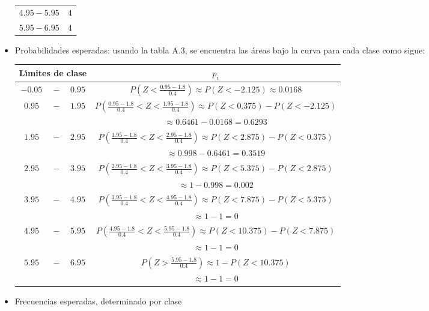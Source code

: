\begin{solucion}
\begin{datos}
\begin{itemize}
\begin{center}
\begin{tabular}{cc}
     $4.95 - 5.95$ & $4$ \\
     $5.95 - 6.95$ & $4$ \\
     \hline 
    \end{tabular}
   \end{center}
   \item Probabilidades esperadas: usando la tabla A.3,
   se encuentra las \'areas bajo la curva para cada clase como sigue:
   \begin{center}
    \begin{tabular}{cccc}
     \hline 
     \multicolumn{3}{c}{\textbf{L\'{\i}mites de clase}} & $p_i$ \\
     \hline 
     $-0.05$ & $-$ & $0.95$ &
     $P\left( Z<\frac{0.95 - 1.8}{0.4}\right) \approx P(Z<-2.125)\approx 0.0168$ \\
     $0.95$ & $-$ & $1.95$ &
     $P\left( \frac{0.95 - 1.8}{0.4} < Z < \frac{1.95 - 1.8}{0.4} \right)
     \approx P(Z < 0.375) - P(Z < -2.125)$ \\
     & & & $\approx 0.6461 - 0.0168 = 0.6293$ \\
     $1.95$ & $-$ & $2.95$ &
     $P\left( \frac{1.95 - 1.8}{0.4} < Z < \frac{2.95 - 1.8}{0.4} \right)
     \approx P(Z < 2.875) - P(Z < 0.375)$ \\
     & & & $\approx 0.998 - 0.6461 = 0.3519$ \\
     $2.95$ & $-$ & $3.95$ &
     $P\left( \frac{2.95 - 1.8}{0.4} < Z < \frac{3.95 - 1.8}{0.4} \right)
     \approx P(Z < 5.375) - P(Z < 2.875)$ \\
     & & & $\approx 1 - 0.998 = 0.002$ \\
     $3.95$ & $-$ & $4.95$ &
     $P\left( \frac{3.95 - 1.8}{0.4} < Z < \frac{4.95 - 1.8}{0.4} \right)
     \approx P(Z < 7.875) - P(Z < 5.375)$ \\
     & & & $\approx 1 - 1 = 0$ \\
     $4.95$ & $-$ & $5.95$ &
     $P\left( \frac{4.95 - 1.8}{0.4} < Z < \frac{5.95 - 1.8}{0.4} \right)
     \approx P(Z < 10.375) - P(Z < 7.875)$ \\
     & & & $\approx 1 - 1 = 0$ \\
     $5.95$ & $-$ & $6.95$ &
     $P\left( Z > \frac{5.95 - 1.8}{0.4} \right) \approx 1 - P(Z < 10.375)$ \\
     & & & $\approx 1 - 1 = 0$ \\
     \hline
    \end{tabular}
   \end{center}
   \item Frecuencias esperadas, determinado por clase

\end{itemize}
\end{datos}
\end{solucion}
